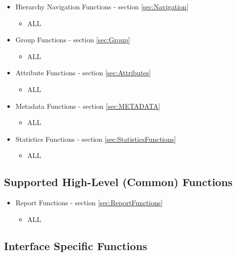 \begin{itemize}[noitemsep,nolistsep] 
	\item{Hierarchy Navigation Functions - section \ref{sec:Navigation}}
		\begin{itemize}[noitemsep,nolistsep] 
			\item{ALL}
		\end{itemize}
	\item{Group Functions - section \ref{sec:Group}}
		\begin{itemize}[noitemsep,nolistsep] 
			\item{ALL}
		\end{itemize}
	\item{Attribute Functions - section \ref{sec:Attributes}}
		\begin{itemize}[noitemsep,nolistsep] 
			\item{ALL}
		\end{itemize}
	\item{Metadata Functions - section \ref{sec:METADATA}}
		\begin{itemize}[noitemsep,nolistsep] 
			\item{ALL}
		\end{itemize}
	\item{Statistics Functions - section \ref{sec:StatisticsFunctions}}
		\begin{itemize}[noitemsep,nolistsep] 
			\item{ALL}
		\end{itemize}
\end{itemize}


\subsection{Supported High-Level (Common) Functions}\label{sec:RMMCHighLevel}

\begin{itemize}[noitemsep,nolistsep] 
	\item{Report Functions} - section \ref{sec:ReportFunctions}
	\begin{itemize}[noitemsep,nolistsep] 
		\item{ALL}
	\end{itemize}
\end{itemize}


\subsection{Interface Specific Functions}\label{sec:RMMCFunctions}



